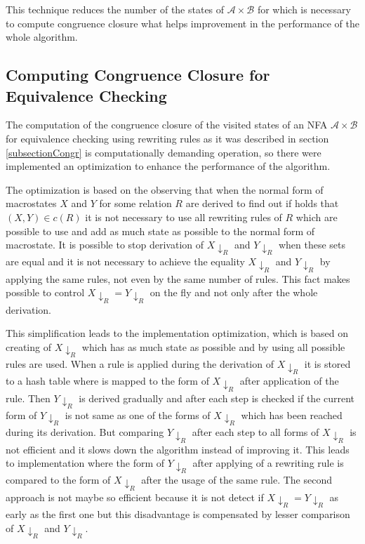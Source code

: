 This technique reduces the number of the states of $\mathcal{A}\times\mathcal{B}$ for which is necessary to compute congruence closure what helps improvement in
the performance of the whole algorithm.

\subsection{Computing Congruence Closure for Equivalence Checking}
The computation of the congruence closure of the visited states of an NFA $\mathcal{A}\times\mathcal{B}$ for equivalence checking using rewriting
rules as it was described in section \ref{subsectionCongr} is computationally demanding operation, 
so there were implemented an optimization to enhance the performance of the algorithm.

The optimization is based on the observing that when the normal form of macrostates $X$ and $Y$ for some relation $R$ are derived to find out if holds that
$(X,Y)\in c(R)$ it is not necessary to use all rewriting rules of $R$ which are possible to use and add as much state as possible to the normal form
of macrostate. It is possible to stop derivation of
$X{\downarrow_R}$ and $Y{\downarrow_R}$ when these sets are equal and it is not necessary to achieve the equality $X{\downarrow_R}$ and $Y{\downarrow_R}$ by
applying the same rules, not even by the same number of rules. 
This fact makes possible to control $X{\downarrow_R} = Y{\downarrow_R}$ on the fly and not only after the whole derivation.

This simplification leads to the implementation optimization, which is based on creating of $X{\downarrow_R}$ which has as much state as possible and by using all
possible rules are used. When a rule is applied during the derivation of $X{\downarrow_R}$ it is stored to a hash table where is mapped to 
the form of $X{\downarrow_R}$ after application of the rule.
Then $Y{\downarrow_R}$ is derived gradually and after each step is checked if the current form of $Y{\downarrow_R}$ is not same as one of the forms of
$X{\downarrow_R}$ which has been reached during its derivation. But comparing $Y{\downarrow_R}$ after each step to all forms of $X{\downarrow_R}$ is not efficient
and it slows down the algorithm instead of improving it. This leads to implementation where the form of $Y{\downarrow_R}$ after applying of a rewriting rule 
is compared to the form of $X{\downarrow_R}$ after the usage of the same rule. 
The second approach is not maybe so efficient because it is not detect if $X{\downarrow_R}=Y{\downarrow_R}$ as early as the first one but this disadvantage is
compensated by lesser comparison of $X{\downarrow_R}$ and $Y{\downarrow_R}$.

